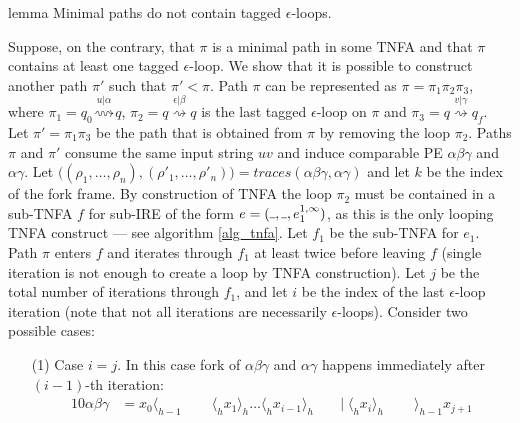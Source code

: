 \documentclass[AMA,STIX1COL]{WileyNJD-v2}
\newcommand{\Xl}{\langle}
\newcommand{\Xr}{\rangle}
\newcommand{\Xund}{\rule{.4em}{.4pt}}
\begin{document}
\begin{theoremEnd}[restate, no link to proof, no link to theorem, category=lemmata_closure]{lemma}
    \label{lemma_closure_minpaths}
    Minimal paths do not contain tagged $\epsilon$-loops.
\end{theoremEnd}
\begin{proofEnd}
    Suppose, on the contrary, that $\pi$ is a minimal path in some TNFA
    and that $\pi$ contains at least one tagged $\epsilon$-loop.
    We show that it is possible to construct another path $\pi'$ such that $\pi' < \pi$.
    Path $\pi$ can be represented as
    $\pi = \pi_1 \pi_2 \pi_3$, where
    $\pi_1 = q_0 \overset {u | \alpha} {\rightsquigarrow} q$,
    $\pi_2 = q \overset {\epsilon | \beta} {\rightsquigarrow} q$ is the last tagged $\epsilon$-loop on $\pi$ and
    $\pi_3 = q \overset {v | \gamma} {\rightsquigarrow} q_f$.
    Let $\pi' = \pi_1 \pi_3$ be the path that is obtained from $\pi$ by removing the loop $\pi_2$.
    Paths $\pi$ and $\pi'$ consume the same input string $uv$
    and induce comparable PE $\alpha \beta \gamma$ and $\alpha \gamma$.
    Let $\big( (\rho_1, \hdots, \rho_n), (\rho'_1, \hdots, \rho'_n) \big) = traces (\alpha \beta \gamma, \alpha \gamma)$
    and let $k$ be the index of the fork frame.
    By construction of TNFA the loop $\pi_2$ must be contained in a sub-TNFA $f$
    for sub-IRE of the form $e = (\Xund, \Xund, e_1^{1,\infty})$,
    as this is the only looping TNFA construct --- see algorithm \ref{alg_tnfa}.
    Let $f_1$ be the sub-TNFA for $e_1$.
    Path $\pi$ enters $f$ and iterates through $f_1$ at least twice before leaving $f$
    (single iteration is not enough to create a loop by TNFA construction).
    Let $j$ be the total number of iterations through $f_1$,
    and let $i$ be the index of the last $\epsilon$-loop iteration
    (note that not all iterations are necessarily $\epsilon$-loops).
    Consider two possible cases:
    \begin{enumerate}[itemsep=0.5em, topsep=0.5em]
    \item[(1)]
        Case $i = j$.
        In this case fork of $\alpha \beta \gamma$ and $\alpha \gamma$ happens immediately after $(i-1)$-th iteration:
        \begin{alignat*}{10}
            \alpha \beta \gamma &= x_0 \Xl_{h-1} \;&&\; \Xl_h x_1 \Xr_h \hdots \Xl_h x_{i-1} \Xr_h \;&&\big|\; \Xl_h x_{i} \Xr_h \;&&\; \Xr_{h-1} x_{j+1} \\[-0.5em]

\end{alignat*}
\end{enumerate}
\end{proofEnd}
\end{document}

